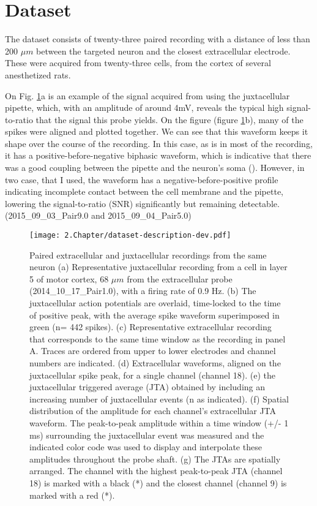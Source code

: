 
\section{Dataset}
\label{sec:Netodataset}
The dataset consists of twenty-three paired recording with a distance of less than 200 $\mu m$ between the targeted neuron and the closest extracellular electrode. These were acquired from twenty-three cells, from the cortex of several anesthetized rats.

On Fig. \ref{fig:neto-data-description}a is an example of the signal acquired from using the juxtacellular pipette, which, with an amplitude of around 4mV, reveals the typical high signal-to-ratio that the signal this probe yields. On the figure (figure \ref{fig:neto-data-description}b), many of the spikes were aligned and  plotted together. We can see that this waveform keeps it shape over the course of the recording. In this case, as is in most of the recording, it has a positive-before-negative biphasic waveform, which is indicative that there was a good coupling between the pipette and the neuron's soma (\cite{herfst2012friction}). However, in two case, that I used, the waveform has a negative-before-positive profile indicating incomplete contact between the cell membrane and the pipette, lowering the signal-to-ratio (SNR) significantly but remaining detectable. (2015\_09\_03\_Pair9.0 and 2015\_09\_04\_Pair5.0)

\begin{figure}[!h]
	\centering
	\texttt{[image: 2.Chapter/dataset-description-dev.pdf]}
	\caption{Paired extracellular and juxtacellular recordings from the same neuron
(a) Representative juxtacellular recording from a cell in layer 5 of motor cortex, 68 $\mu m$ from the extracellular probe (2014\_10\_17\_Pair1.0), with a firing rate of 0.9 Hz. (b) The juxtacellular action potentials are overlaid, time-locked to the time of positive peak, with the average spike waveform superimposed in green (n= 442 spikes). (c) Representative extracellular recording that corresponds to the same time window as the recording in panel A. Traces are ordered from upper to lower electrodes and channel numbers are indicated. (d) Extracellular waveforms, aligned on the juxtacellular spike peak, for a single channel (channel 18). (e) the juxtacellular triggered average (JTA) obtained by including an increasing number of juxtacellular events (n as indicated). (f) Spatial distribution of the amplitude for each channel’s extracellular JTA waveform. The peak-to-peak amplitude within a time window (+/- 1 ms) surrounding the juxtacellular event was measured and the indicated color code was used to display and interpolate these amplitudes throughout the probe shaft. (g) The JTAs are spatially arranged. The channel with the highest peak-to-peak JTA (channel 18) is marked with a black (*) and the closest channel (channel 9) is marked with a red (*).
}
\label{fig:neto-data-description}
\end{figure}

